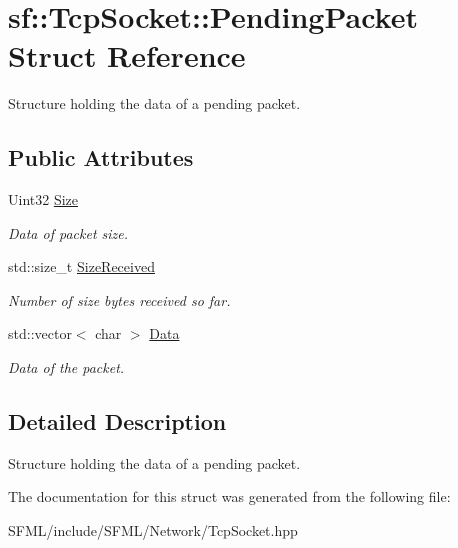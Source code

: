 \hypertarget{structsf_1_1_tcp_socket_1_1_pending_packet}{}\section{sf\+:\+:Tcp\+Socket\+:\+:Pending\+Packet Struct Reference}
\label{structsf_1_1_tcp_socket_1_1_pending_packet}


Structure holding the data of a pending packet.  


\subsection*{Public Attributes}
\begin{DoxyCompactItemize}
\item 
\mbox{\label{structsf_1_1_tcp_socket_1_1_pending_packet_a99f5a620c08f0dc81aee252846455f7b}} 
Uint32 \mbox{\hyperlink{structsf_1_1_tcp_socket_1_1_pending_packet_a99f5a620c08f0dc81aee252846455f7b}{Size}}
\begin{DoxyCompactList}\small\item\em Data of packet size. \end{DoxyCompactList}\item 
\mbox{\label{structsf_1_1_tcp_socket_1_1_pending_packet_abb050cdf4dab2d1dc0c55bed6a085941}} 
std\+::size\+\_\+t \mbox{\hyperlink{structsf_1_1_tcp_socket_1_1_pending_packet_abb050cdf4dab2d1dc0c55bed6a085941}{Size\+Received}}
\begin{DoxyCompactList}\small\item\em Number of size bytes received so far. \end{DoxyCompactList}\item 
\mbox{\label{structsf_1_1_tcp_socket_1_1_pending_packet_aed40be724851c582f4427af1960689e4}} 
std\+::vector$<$ char $>$ \mbox{\hyperlink{structsf_1_1_tcp_socket_1_1_pending_packet_aed40be724851c582f4427af1960689e4}{Data}}
\begin{DoxyCompactList}\small\item\em Data of the packet. \end{DoxyCompactList}\end{DoxyCompactItemize}


\subsection{Detailed Description}
Structure holding the data of a pending packet. 

\begin{DoxyVerb}\end{DoxyVerb}
 

The documentation for this struct was generated from the following file\+:\begin{DoxyCompactItemize}
\item 
S\+F\+M\+L/include/\+S\+F\+M\+L/\+Network/Tcp\+Socket.\+hpp\end{DoxyCompactItemize}
